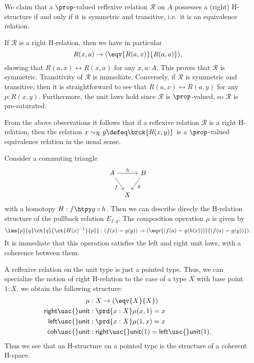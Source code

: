 \begin{eg}
We claim that a $\prop$-valued reflexive relation $\mathcal{R}$ on $A$ possesses a (right) H-structure if and only if it is symmetric and transitive, i.e.~it is an equivalence relation.

If $\mathcal{R}$ is a right H-relation, then we have in particular 
\begin{equation*}
R(x,a)\to (\eqv{R(a,x)}{R(a,a)}),
\end{equation*}
showing that $R(a,x)\leftrightarrow R(x,a)$ for any $x,a:A$. This proves that $\mathcal{R}$ is symmetric. Transitivity of $\mathcal{R}$ is immediate.
Conversely, if $\mathcal{R}$ is symmetric and transitive, then it is straightforward to see that $R(a,x)\leftrightarrow R(a,y)$ for any $p:R(x,y)$. Furthermore, the unit laws hold since $\mathcal{R}$ is $\prop$-valued, so $\mathcal{R}$ is pre-saturated. 

From the above observations it follows that if a reflexive relation $\mathcal{R}$ is a right H-relation, then the relation $x \sim_{\mathcal{R}} y \defeq \brck{R(x,y)}$ is a $\prop$-valued equivalence relation in the usual sense.
\end{eg}

\begin{eg}
Consider a commuting triangle
\begin{equation*}
\begin{tikzcd}[column sep=tiny]
A \arrow[rr,"h"] \arrow[dr,swap,"f"] & & B \arrow[dl,"g"] \\
& X
\end{tikzcd}
\end{equation*}
with a homotopy $H:f\htpy g\circ h$. Then we can describe direcly the H-relation structure of the pullback relation $E_{f,g}$. The composition operation $\mu$ is given by
\begin{equation*}
\lam{p}{q} \ct{q}{\ct{H(x)^{-1}}{p}} : (f(x)=g(y))\to (\eqv{(f(a)=g(h(x)))}{(f(a)=g(y))}).
\end{equation*}
It is immediate that this operation satisfies the left and right unit laws, with a coherence between them.
\end{eg}

\begin{eg}
A reflexive relation on the unit type is just a pointed type. 
Thus, we can specialize the notion of right H-relation to the case of a type $X$ with base point $1:X$, we obtain the following structure:
\begin{align*}
\mu & : X \to (\eqv{X}{X}) \\
\mathsf{right\usc{}unit} & : \prd{x:X} \mu(x,1)=x \\
\mathsf{left\usc{}unit} & : \prd{x:X} \mu(1,x)=x \\
\mathsf{coh\usc{}unit} & : \mathsf{right\usc{}unit}(1)=\mathsf{left\usc{}unit}(1).
\end{align*}
Thus we see that an H-structure on a pointed type is the structure of a coherent H-space.
\end{eg}

